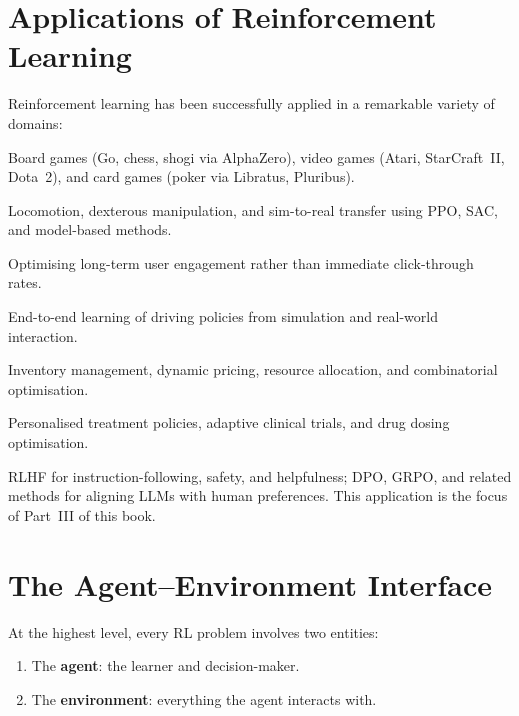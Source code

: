 \section{Applications of Reinforcement Learning}
\label{sec:applications}

Reinforcement learning has been successfully applied in a remarkable variety of domains:

\begin{description}[leftmargin=!,labelwidth=3.5cm]
\item[Game playing]
Board games (Go, chess, shogi via AlphaZero), video games (Atari, StarCraft~II, Dota~2), and card games (poker via Libratus, Pluribus).

\item[Robotics]
Locomotion, dexterous manipulation, and sim-to-real transfer using PPO, SAC, and model-based methods.

\item[Recommendation systems]
Optimising long-term user engagement rather than immediate click-through rates.

\item[Autonomous driving]
End-to-end learning of driving policies from simulation and real-world interaction.

\item[Operations research]
Inventory management, dynamic pricing, resource allocation, and combinatorial optimisation.

\item[Healthcare]
Personalised treatment policies, adaptive clinical trials, and drug dosing optimisation.

\item[Language model alignment]
RLHF for instruction-following, safety, and helpfulness; DPO, GRPO, and related methods for aligning LLMs with human preferences.  This application is the focus of Part~III of this book.
\end{description}


\section{The Agent--Environment Interface}
\label{sec:agent-env}

At the highest level, every RL problem involves two entities:

\begin{enumerate}
\item The \textbf{agent}: the learner and decision-maker.
\item The \textbf{environment}: everything the agent interacts with.
\end{enumerate}


